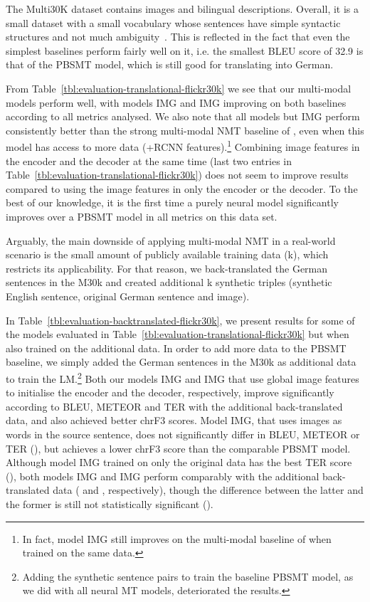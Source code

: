 \documentclass[11pt,twocolumn]{article}
\begin{document}
The Multi30K dataset contains images and bilingual descriptions.
Overall, it is a small dataset with a small vocabulary whose sentences have simple syntactic structures and not much ambiguity~\cite{ElliottFrankSimaanSpecia2016}.
This is reflected in the fact that even the simplest baselines perform fairly well on it, i.e. the smallest BLEU score of 32.9 is that of the PBSMT model, which is still good for translating into German.

From Table~\ref{tbl:evaluation-translational-flickr30k} we see that our multi-modal models perform well, with models IMG and IMG improving on both baselines according to all metrics analysed.
We also note that all models but IMG perform consistently better than the strong multi-modal NMT baseline of , even when this model has access to more data (+RCNN features).\footnote{In fact, model IMG still improves on the multi-modal baseline of  when trained on the same data.}
Combining image features in the encoder and the decoder at the same time (last two entries in Table~\ref{tbl:evaluation-translational-flickr30k}) does not seem to improve results compared to using the image features in only the encoder or the decoder.
To the best of our knowledge, it is the first time a purely neural model significantly improves over a PBSMT model in all metrics on this data set.

Arguably, the main downside of applying multi-modal NMT in a real-world scenario is the small amount of publicly available training data (k), which restricts its applicability.
For that reason, we back-translated the German sentences in the M30k and created additional k synthetic triples (synthetic English sentence, original German sentence and image).

In Table~\ref{tbl:evaluation-backtranslated-flickr30k}, we present results for some of the models evaluated in Table~\ref{tbl:evaluation-translational-flickr30k} but when also trained on the additional data.
In order to add more data to the PBSMT baseline, we simply added the German sentences in the M30k as additional data to train the LM.\footnote{Adding the synthetic sentence pairs to train the baseline PBSMT model, as we did with all neural MT models, deteriorated the results.}
Both our models IMG and IMG that use global image features to initialise the encoder and the decoder, respectively, improve significantly according to BLEU, METEOR and TER with the additional back-translated data,
and also achieved better chrF3 scores.
Model IMG, that uses images as words in the source sentence, does not significantly differ in BLEU, METEOR or TER (), but achieves a lower chrF3 score than the comparable PBSMT model.
Although model IMG trained on only the original data has the best TER score (), both models IMG and IMG perform comparably with the additional back-translated data ( and , respectively), though the difference between the latter and the former is still not statistically significant ().
\end{document}
